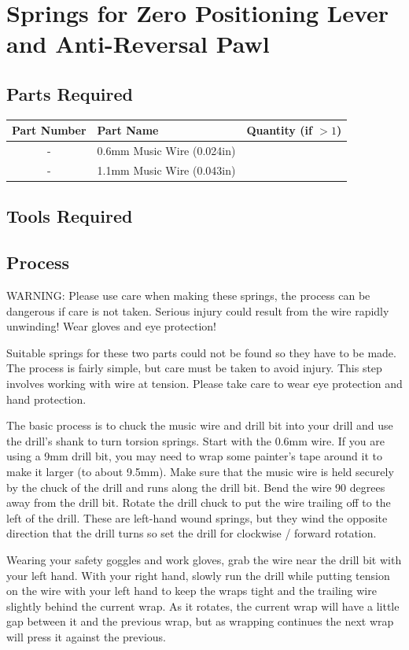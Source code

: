 \documentclass[openany]{book}
\begin{document}
\chapter{Springs for Zero Positioning Lever and Anti-Reversal Pawl}
\section{Parts Required}
\begin{table}[!ht]
	\centering
	\begin{tabular}{clc}
		Part Number & Part Name & Quantity (if $>1$) \\ \hline
		- & 0.6mm Music Wire (0.024in) & \\
		- & 1.1mm Music Wire (0.043in) & 
	\end{tabular}
\end{table}



\section{Tools Required}

\section{Process}
WARNING: Please use care when making these springs, the process can be dangerous if care is not taken. Serious injury could result from the wire rapidly unwinding! Wear gloves and eye protection!


Suitable springs for these two parts could not be found so they have to be made. The process is fairly simple, but care must be taken to avoid injury. This step involves working with wire at tension. Please take care to wear eye protection and hand protection.

The basic process is to chuck the music wire and drill bit into your drill and use the drill’s shank to turn torsion springs. Start with the 0.6mm wire. If you are using a 9mm drill bit, you may need to wrap some painter’s tape around it to make it larger (to about 9.5mm). Make sure that the music wire is held securely by the chuck of the drill and runs along the drill bit. Bend the wire 90 degrees away from the drill bit. Rotate the drill chuck to put the wire trailing off to the left of the drill. These are left-hand wound springs, but they wind the opposite direction that the drill turns so set the drill for clockwise / forward rotation.

Wearing your safety goggles and work gloves, grab the wire near the drill bit with your left hand. With your right hand, slowly run the drill while putting tension on the wire with your left hand to keep the wraps tight and the trailing wire slightly behind the current wrap. As it rotates, the current wrap will have a little gap between it and the previous wrap, but as wrapping continues the next wrap will press it against the previous.
\end{document}
